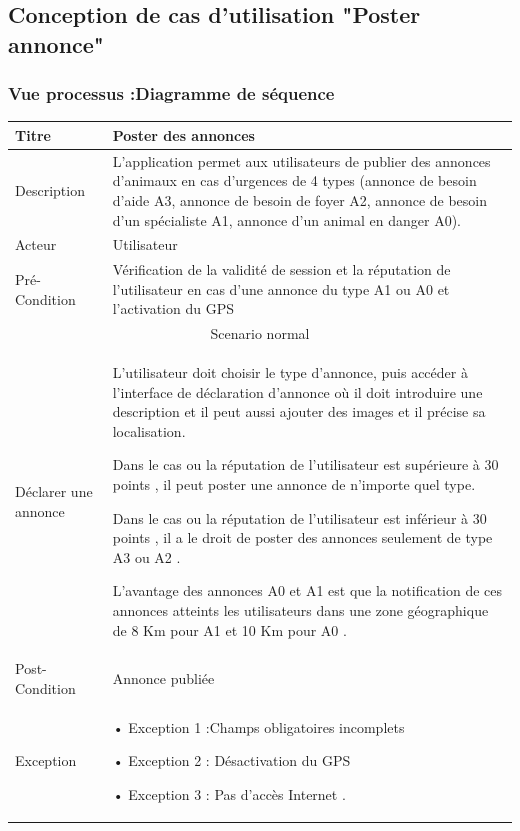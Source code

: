 \documentclass[11pt,a4paper,oneside]{book}
\begin{document}
				\subsection{Conception de cas d’utilisation "Poster annonce"}
				\subsubsection{Vue processus :Diagramme de séquence}
				\begin{tabular}{ |p{3cm}|p{11cm}|  }
					
					\hline
					Titre&  Poster des annonces\\
					\hline
					Description  &L’application permet aux utilisateurs de publier des annonces d’animaux en cas d’urgences de 4 types (annonce de besoin d’aide A3, annonce de besoin de
					foyer A2, annonce de besoin d’un spécialiste A1, annonce d’un animal en danger A0).
					\\
					\hline
					Acteur&Utilisateur\\
					\hline
					Pré-Condition &Vérification de la validité de session et la réputation de l’utilisateur en cas d’une annonce du type A1 ou A0 et l’activation du GPS 
					\\
					\hline
					\multicolumn{2}{|c|}{Scenario normal} \\
					\hline
					Déclarer une annonce&L’utilisateur doit choisir le type d'annonce, puis accéder à l’interface de déclaration d’annonce où il doit introduire une description et il peut aussi ajouter des images et il précise sa localisation.
					
					
					\vspace{5mm} %
					Dans le cas ou la réputation de l’utilisateur est supérieure à 30 points , il peut poster une annonce de n’importe quel type.
					
					
					\vspace{5mm} %
					Dans le cas ou la réputation de l’utilisateur est inférieur à 30 points , il a le droit de poster des annonces seulement de type A3 ou A2 .
					
					
					\vspace{5mm} %
					L’avantage des annonces A0 et A1 est que la notification de ces annonces atteints les utilisateurs dans une zone géographique de 8 Km pour A1 et 10 Km pour A0 .
					\\
					
					\hline
					Post-Condition& Annonce publiée\\
					\hline
					Exception&  • Exception 1 :Champs obligatoires incomplets 
					
					• Exception 2 : Désactivation du GPS
					
					
					• Exception 3 : Pas d'accès Internet .\\
					\hline
				\end{tabular}
\end{document}

